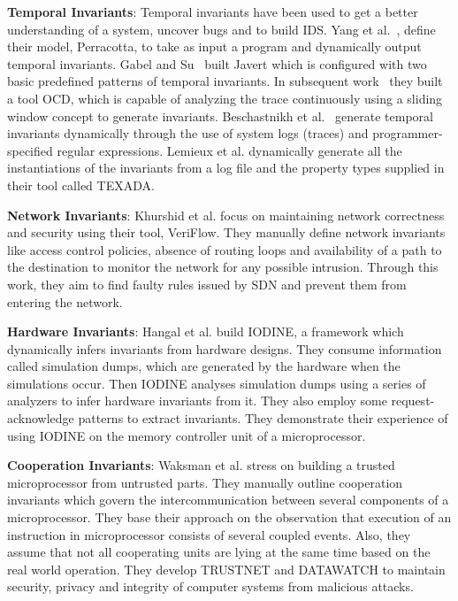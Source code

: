 \textbf{Temporal Invariants}: Temporal invariants have been used to get a better understanding of a system, uncover bugs and to build \ac{IDS}. Yang et al.~\cite{yang2006perracotta}, define their model, Perracotta, to take as input a program and dynamically output temporal invariants. Gabel and Su~\cite{gabel2008javert} built Javert which is configured with two basic predefined patterns of temporal invariants. In subsequent work~\cite{gabel2010online} they built a tool OCD, which is capable of analyzing the trace continuously using a sliding window concept to generate invariants. Beschastnikh et al.~\cite{beschastnikh2011leveraging} generate temporal invariants dynamically through the use of system logs (traces) and programmer-specified regular expressions. Lemieux et al. \cite{lemieux2015general} dynamically generate all the instantiations of the invariants from a log file and the property types supplied in their tool called TEXADA. 

\textbf {Network Invariants}: Khurshid et al.\cite{khurshid2012veriflow} focus on maintaining network correctness and security using their tool, VeriFlow. They manually define network invariants like access control policies, absence of routing loops and availability of a path to the destination to monitor the network for any possible intrusion. Through this work, they aim to find faulty rules issued by SDN and prevent them from entering the network.

\textbf {Hardware Invariants}: Hangal et al.\cite{hangal2005iodine} build IODINE, a framework which dynamically infers invariants from hardware designs. They consume information called simulation dumps, which are generated by the hardware when the simulations occur. Then IODINE analyses simulation dumps using a series of analyzers to infer hardware invariants from it. They also employ some request-acknowledge patterns to extract invariants. They demonstrate their experience of using IODINE on the memory controller unit of a microprocessor. 

\textbf{Cooperation Invariants}: Waksman et al.\cite{waksman2010tamper} stress on building a trusted microprocessor from untrusted parts. They manually outline cooperation invariants which govern the intercommunication between several components of a microprocessor. They base their approach on the observation that execution of an instruction in microprocessor consists of several coupled events. Also, they assume that not all cooperating units are lying at the same time based on the real world operation. They develop TRUSTNET and DATAWATCH to maintain security, privacy and integrity of computer systems from malicious attacks.

